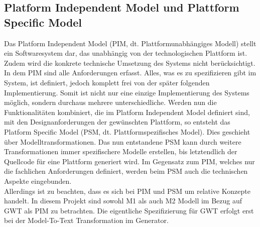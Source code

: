 \subsection{Platform Independent Model und Plattform Specific Model} \label{PIMPSM}
Das Platform Independent Model (PIM, dt. Plattformunabhängiges Modell) stellt ein
Softwaresystem dar, das unabhängig von der technologischen Plattform ist. Zudem wird die konkrete technische Umsetzung des Systems nicht berücksichtigt. In dem PIM
sind alle Anforderungen erfasst. Alles, was es zu spezifizieren gibt im System, ist definiert,
jedoch komplett frei von der später folgenden Implementierung. Somit ist nicht nur eine
einzige Implementierung des Systems möglich, sondern durchaus mehrere
unterschiedliche.
Werden nun die Funktionalitäten kombiniert, die im Platform Independent Model definiert sind, mit den Designanforderungen der gewünschten Plattform, so entsteht das Platform Specific Model (PSM, dt. Plattformspezifisches Model). Dies geschieht über Modelltransformationen. Das nun entstandene PSM kann durch weitere Transformationen immer spezifischere Modelle erstellen, bis letztendlich der Quellcode für eine Plattform generiert wird. Im Gegensatz zum PIM, welches nur die
fachlichen Anforderungen definiert, werden beim PSM auch die technischen Aspekte
eingebunden.\cite[S.377 ff.]{bib:MDA2}\cite{bib:MDA3}\\ 
 
Allerdings ist zu beachten, dass es sich bei PIM und PSM um relative Konzepte handelt. 
In diesem Projekt sind sowohl M1 als auch M2 Modell im Bezug auf GWT als PIM zu betrachten. Die eigentliche Spezifizierung für GWT erfolgt erst bei der Model-To-Text Transformation im Generator.
